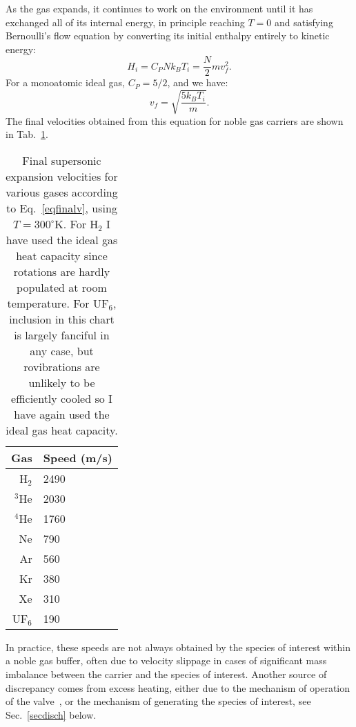 As the gas expands, it continues to work on the environment until it has exchanged all of its internal energy, in principle reaching $T=0$ and satisfying Bernoulli's flow equation by converting its initial enthalpy entirely to kinetic energy:
\begin{equation}
H_i = C_PNk_BT_i = \frac{N}{2}mv_f^2.
\end{equation}
For a monoatomic ideal gas, $C_P = 5/2$, and we have:
\begin{equation}
v_f = \sqrt{\frac{5k_BT_i}{m}}.\label{eqfinalv}
\end{equation}
The final velocities obtained from this equation for noble gas carriers are shown in Tab.~\ref{tabfinal}.
\begin{table}[t!]
\centering
\caption[Final Supersonic Expansion Velocities]{Final supersonic expansion velocities for various gases according to Eq.~\ref{eqfinalv}, using $T=300^\circ$K. For H$_2$ I have used the ideal gas heat capacity since rotations are hardly populated at room temperature. For UF$_6$, inclusion in this chart is largely fanciful in any case, but rovibrations are unlikely to be efficiently cooled so I have again used the ideal gas heat capacity.\label{tabfinal}}
\begin{tabular}{r|l}
Gas & Speed (m/s)\\
\hline
H$_2$ & 2490\\
$^3$He & 2030 \\
$^4$He & 1760 \\
Ne & 790 \\
Ar & 560 \\
Kr & 380 \\
Xe & 310 \\
UF$_6$ & 190
\end{tabular}
\end{table}
In practice, these speeds are not always obtained by the species of interest within a noble gas buffer, often due to velocity slippage in cases of significant mass imbalance between the carrier and the species of interest.
Another source of discrepancy comes from excess heating, either due to the mechanism of operation of the valve~\citep[Sec.~3.1.3.1]{SawyerThesis2010}, or the mechanism of generating the species of interest, see Sec.~\ref{secdisch} below.

